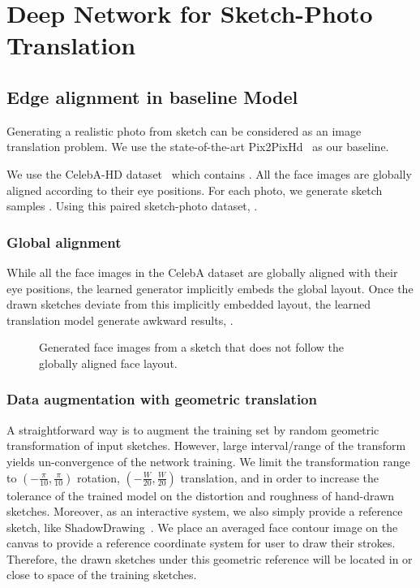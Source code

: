 
\section{Deep Network for Sketch-Photo Translation}
\label{sec:network}

\subsection{Edge alignment in baseline Model}

Generating a realistic photo from sketch can be considered as an image translation problem. 
We use the state-of-the-art Pix2PixHd~\cite{} as our baseline. 
% 
 
We use the CelebA-HD dataset~\cite{} which contains . All the face images are globally aligned according to their eye positions. 
For each photo, we generate sketch samples .
%
Using this paired sketch-photo dataset, .

\subsubsection{Global alignment}
While all the face images in the CelebA dataset \cite{} are globally aligned with their eye positions, the learned generator implicitly embeds the global layout. Once the drawn sketches deviate from this implicitly embedded layout, the learned translation model generate awkward results, . 


\begin{figure}
	\centering
	\vspace{1.0cm}
	\caption{Generated face images from a sketch that does not follow the globally aligned face layout.}
	\label{fig:global-align-fail}
\end{figure}

\subsubsection{Data augmentation with geometric translation}
A straightforward way is to augment the training set by random geometric transformation of input sketches. 
However, large interval/range of the transform yields un-convergence of the network training. 
We limit the transformation range to $(-\frac{\pi}{10},\frac{\pi}{10})$ rotation, $(-\frac{W}{20},\frac{W}{20})$ translation, and  in order to increase the tolerance of the trained model on the distortion and roughness of hand-drawn sketches. 
%
Moreover, as an interactive system, we also simply provide a reference sketch, like ShadowDrawing~\cite{}.
We place an averaged face contour image on the canvas to provide a reference coordinate system for user to draw their strokes. 
Therefore, the drawn sketches under this geometric reference will be located in or close to space of the training sketches.


